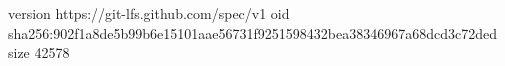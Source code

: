 version https://git-lfs.github.com/spec/v1
oid sha256:902f1a8de5b99b6e15101aae56731f9251598432bea38346967a68dcd3c72ded
size 42578
